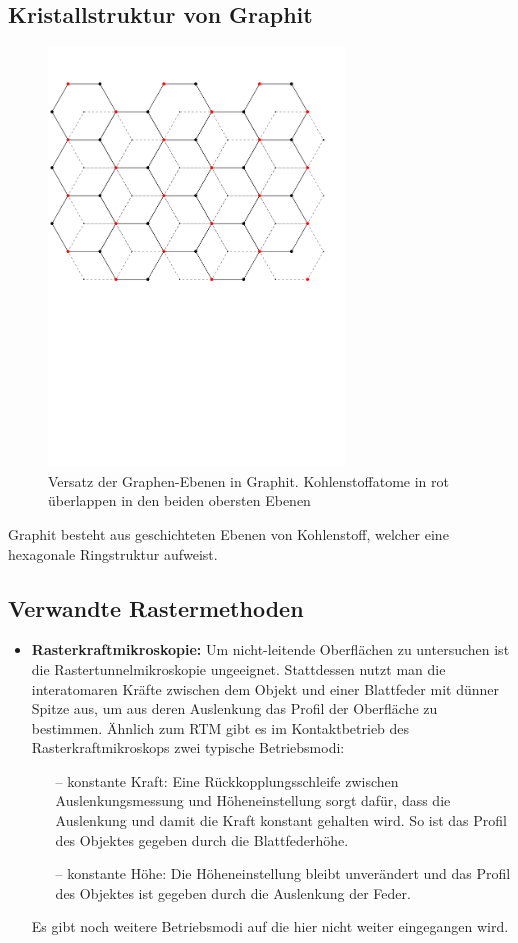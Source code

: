 \documentclass[10pt, a4paper]{article}
\begin{document}
\subsection{Kristallstruktur von Graphit}
\begin{figure}[h]
  \centering
  \includegraphics[width=0.7\textwidth]{grafiken/graphit.pdf}
  \caption{Versatz der Graphen-Ebenen in Graphit. Kohlenstoffatome in rot überlappen in den beiden obersten Ebenen}
\end{figure}
Graphit besteht aus geschichteten Ebenen von Kohlenstoff, welcher eine hexagonale Ringstruktur aufweist. 

\subsection{Verwandte Rastermethoden}
\begin{itemize}
  \item \textbf{Rasterkraftmikroskopie:} Um nicht-leitende Oberflächen zu untersuchen ist die Rastertunnelmikroskopie ungeeignet.
  Stattdessen nutzt man die interatomaren Kräfte zwischen dem Objekt und einer Blattfeder mit dünner Spitze aus, um aus deren Auslenkung das Profil der Oberfläche zu bestimmen.
  Ähnlich zum RTM gibt es im Kontaktbetrieb des Rasterkraftmikroskops zwei typische Betriebsmodi:
  \begin{itemize}
  \item[--] konstante Kraft: Eine Rückkopplungsschleife zwischen Auslenkungsmessung und Höheneinstellung sorgt dafür, dass die Auslenkung und damit die Kraft konstant gehalten wird.
  So ist das Profil des Objektes gegeben durch die Blattfederhöhe.
  \item[--] konstante Höhe: Die Höheneinstellung bleibt unverändert und das Profil des Objektes ist gegeben durch die Auslenkung der Feder.
  \end{itemize}
  Es gibt noch weitere Betriebsmodi auf die hier nicht weiter eingegangen wird.
\end{itemize}
\end{document}
